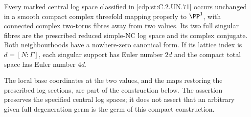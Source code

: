 
\begin{proposition}\label{cdp:st:C.2.UN.73}
Every marked central log space classified in \ref{cdp:st:C.2.UN.71} occurs
unchanged in a smooth compact complex threefold mapping
properly to $\PP^1$, with connected complex two-torus
fibres away from two values. Its two full singular fibres
are the prescribed reduced simple-NC log space and its
complex conjugate. Both neighbourhoods have a nowhere-zero
canonical form. If its lattice index is $d=[N:\Gamma]$,
each singular support has Euler number $2d$ and the
compact total space has Euler number $4d$.

The local base coordinates at the two values, and the
maps restoring the prescribed log sections, are part
of the construction below. The assertion preserves
the specified central log spaces; it does not assert
that an arbitrary given full degeneration germ is
the germ of this compact construction.
\end{proposition}

